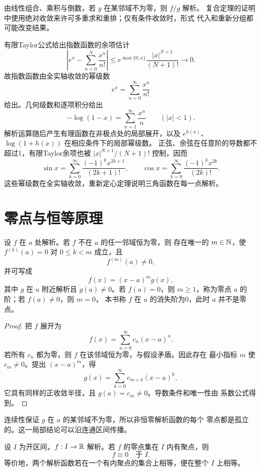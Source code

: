 由线性组合、乘积与倒数，若 \(g\) 在某邻域不为零，则 \(f/g\) 解析。
复合定理的证明中使用绝对收敛来许可多重求和重排；仅有条件收敛时，形式
代入和重新分组都可能改变结果。

\begin{example}
有限Taylor公式给出指数函数的余项估计
\[
 \left|e^x-\sum_{n=0}^N\frac{x^n}{n!}\right|
 \le e^{\max\{0,x\}}\frac{|x|^{N+1}}{(N+1)!}\longrightarrow0.
\]
故指数函数由全实轴收敛的幂级数
\[
 e^x=\sum_{n=0}^\infty\frac{x^n}{n!}
\]
给出。几何级数和逐项积分给出
\[
 -\log(1-x)=\sum_{n=1}^\infty\frac{x^n}{n}
 \qquad(|x|<1).
\]
解析运算随后产生有理函数在非极点处的局部展开，以及
\(e^{h(x)}\)、\(\log(1+h(x))\) 在相应条件下的局部幂级数。
正弦、余弦在任意阶的导数都不超过1，有限Taylor余项也被
\(|x|^{N+1}/(N+1)!\) 控制，因而
\[
 \sin x=\sum_{k=0}^\infty\frac{(-1)^kx^{2k+1}}{(2k+1)!},\qquad
 \cos x=\sum_{k=0}^\infty\frac{(-1)^kx^{2k}}{(2k)!}.
\]
这些幂级数在全实轴收敛，重新定心定理说明三角函数在每一点解析。
\end{example}

\section{零点与恒等原理}

\begin{theorem}[零点的阶]
\label{thm:analytic-zero-order}
设 \(f\) 在 \(a\) 处解析。若 \(f\) 不在 \(a\) 的任一邻域恒为零，则
存在唯一的 \(m\in\mathbb{N}\)，使 \(f^{(k)}(a)=0\) 对 \(0\le k<m\) 成立，且
\[
 f^{(m)}(a)\ne0,
\]
并可写成
\[
 f(x)=(x-a)^m g(x),
\]
其中 \(g\) 在 \(a\) 附近解析且 \(g(a)\ne0\)。若 \(f(a)=0\)，则
\(m\ge1\)，称为零点 \(a\) 的阶；若 \(f(a)\ne0\)，则 \(m=0\)，
本书称 \(f\) 在 \(a\) 的消失阶为0，此时 \(a\) 并不是零点。
\end{theorem}

\begin{proof}
把 \(f\) 展开为
\[
 f(x)=\sum_{n=0}^\infty c_n(x-a)^n.
\]
若所有 \(c_n\) 都为零，则 \(f\) 在该邻域恒为零，与假设矛盾。因此存在
最小指标 \(m\) 使 \(c_m\ne0\)。提出 \((x-a)^m\)，得
\[
 g(x)=\sum_{k=0}^\infty c_{m+k}(x-a)^k,
\]
它具有同样的正收敛半径，且 \(g(a)=c_m\ne0\)。导数条件和唯一性由
系数公式得到。
\end{proof}

连续性保证 \(g\) 在 \(a\) 的某邻域不为零，所以非恒零解析函数的每个
零点都是孤立的。这一局部结论可以沿连通区间传播。

\begin{theorem}[实解析函数的恒等原理]
\label{thm:real-analytic-identity}
设 \(I\) 为开区间，\(f:I\to\mathbb{R}\) 解析。若 \(f\) 的零点集在 \(I\)
内有聚点，则
\[
 f\equiv0\quad\text{于 }I.
\]
等价地，两个解析函数若在一个有内聚点的集合上相等，便在整个 \(I\)
上相等。
\end{theorem}

